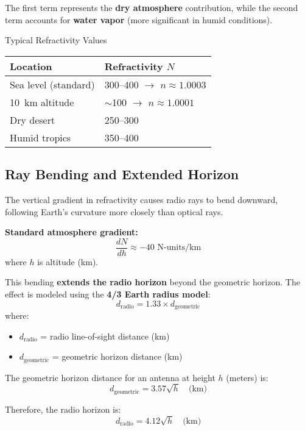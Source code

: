 The first term represents the \textbf{dry atmosphere} contribution, while the second term accounts for \textbf{water vapor} (more significant in humid conditions).

\begin{calloutbox}{Typical Refractivity Values}
\begin{tabular}{@{}ll@{}}
\toprule
Location & Refractivity $N$ \\
\midrule
Sea level (standard) & 300--400 $\rightarrow$ $n \approx 1.0003$ \\
10~km altitude & $\sim$100 $\rightarrow$ $n \approx 1.0001$ \\
Dry desert & 250--300 \\
Humid tropics & 350--400 \\
\bottomrule
\end{tabular}
\end{calloutbox}

\subsection{Ray Bending and Extended Horizon}

The vertical gradient in refractivity causes radio rays to bend downward, following Earth's curvature more closely than optical rays.

\textbf{Standard atmosphere gradient:}
\begin{equation}
\frac{dN}{dh} \approx -40 \text{~N-units/km}
\end{equation}
where $h$ is altitude (km).

This bending \textbf{extends the radio horizon} beyond the geometric horizon. The effect is modeled using the \textbf{4/3 Earth radius model}:
\begin{equation}
d_{\text{radio}} = 1.33 \times d_{\text{geometric}}
\end{equation}
where:
\begin{itemize}
\item $d_{\text{radio}}$ = radio line-of-sight distance (km)
\item $d_{\text{geometric}}$ = geometric horizon distance (km)
\end{itemize}

The geometric horizon distance for an antenna at height $h$ (meters) is:
\begin{equation}
d_{\text{geometric}} = 3.57\sqrt{h} \quad \text{(km)}
\end{equation}

Therefore, the radio horizon is:
\begin{equation}
d_{\text{radio}} = 4.12\sqrt{h} \quad \text{(km)}
\end{equation}

